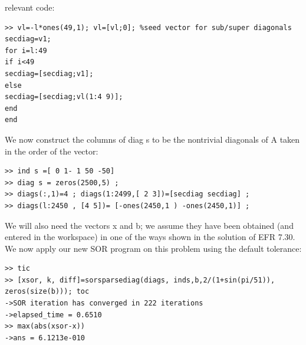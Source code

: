 \documentclass[../main.tex]{subfiles}
\begin{document}
relevant code: 
\begin{lstlisting}[numbers=none,frame=none]
>> vl=-l*ones(49,1); vl=[vl;0]; %seed vector for sub/super diagonals 
secdiag=v1; 
for i=l:49 
if i<49 
secdiag=[secdiag;v1]; 
else 
secdiag=[secdiag;vl(1:4 9)]; 
end 
end
\end{lstlisting}
We now construct the columns of diag s to be the nontrivial diagonals of A taken in the order of the 
vector: 
\begin{lstlisting}[numbers=none,frame=none]
>> ind s =[ 0 1- 1 50 -50] 
>> diag s = zeros(2500,5) ; 
>> diags(:,1)=4 ; diags(1:2499,[ 2 3])=[secdiag secdiag] ; 
>> diags(l:2450 , [4 5])= [-ones(2450,1 ) -ones(2450,1)] ;
\end{lstlisting}
We will also need the vectors x and b; we assume they have been obtained (and entered in the 
workspace) in one of the ways shown in the solution of EFR 7.30. We now apply our new SOR 
program on this problem using the default tolerance: 
\begin{lstlisting}[numbers=none,frame=none]
>> tic 
>> [xsor, k, diff]=sorsparsediag(diags, inds,b,2/(1+sin(pi/51)), 
zeros(size(b))); toc 
->SOR iteration has converged in 222 iterations 
->elapsed_time = 0.6510 
>> max(abs(xsor-x)) 
->ans = 6.1213e-010 
\end{lstlisting}
\end{document}
